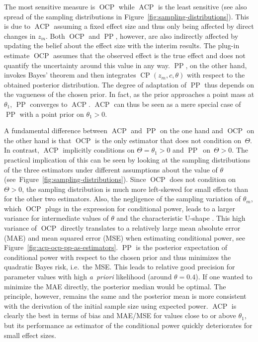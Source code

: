 \documentclass{article}
\newcommand{\CP}{\ensuremath{\operatorname{CP}}}
\newcommand{\ACP}{\ensuremath{\operatorname{ACP}}}
\newcommand{\OCP}{\ensuremath{\operatorname{OCP}}}
\newcommand{\PP}{\ensuremath{\operatorname{PP}}}
\begin{document}
The most sensitive measure is $\OCP$ while $\ACP$ is the least sensitive
(see also spread of the sampling distributions in Figure~\ref{fig:sampling-distributions}). 
This is due to $\ACP$ assuming a fixed effect size and thus 
only being affected by direct changes in $z_m$.
Both $\OCP$ and $\PP$, however, are also indirectly affected by updating 
the belief about the effect size with the interim results.
The plug-in estimate $\OCP$ assumes that the observed effect is the 
true effect and does not quantify the uncertainty around this value in any way. 
$\PP$, on the other hand, invokes Bayes' theorem and then integrates 
$\CP(z_m,c,\theta)$ with respect to the obtained posterior distribution. 
The degree of adaptation of $\PP$ thus depends 
on the vagueness of the chosen prior. 
In fact, as the prior approaches a point mass at $\theta_1$, $\PP$ converges
to $\ACP$.
$\ACP$ can thus be seen as a mere special case of $\PP$ with a point prior
on $\theta_1>0$.

A fundamental difference between $\ACP$ and $\PP$ on the one hand and $\OCP$ on the other hand is that
$\OCP$ is the only estimator that does not condition on~$\Theta$.
In contrast, $\ACP$ implicitly conditions on $\Theta=\theta_1>0$ and 
$\PP$~on~${\Theta > 0}$.
The practical implication of this can be seen 
by looking at the sampling distributions of the 
three estimators under different assumptions 
about the value of $\theta$ (see~Figure~\ref{fig:sampling-distributions}).
Since $\OCP$ does not condition on $\Theta>0$, the sampling distribution is much more left-skewed for small effects than for the other two estimators.
Also, the negligence of the sampling variation of $\widehat{\theta}_m$, which $\OCP$ plugs in the expression for conditional power, leads to a larger variance for intermediate values of $\theta$ and the characteristic
U-shape \citep{bauer2006}.
This high variance of $\OCP$ directly translates to a relatively large mean absolute error (MAE) and mean squared error (MSE) when estimating conditional power, 
see Figure~\ref{fig:acp-ocp-pp-as-estimators}.
$\PP$ is the posterior expectation of conditional power with respect to the chosen prior and thus  minimizes the quadratic Bayes risk, i.e.~the MSE.
This leads to relative good precision for parameter values with high \textit{a~priori} likelihood 
(around $\theta=0.4$).
If one wanted to minimize the MAE directly, 
the posterior median would be optimal.
The principle, however, remains the same and
the posterior mean is more consistent with the derivation of the initial sample size using expected power. 
$\ACP$ is clearly the best in terms of bias and MAE/MSE for values close to or
above $\theta_1$, but its performance as estimator of the conditional power 
quickly deteriorates for small effect sizes.
\end{document}
